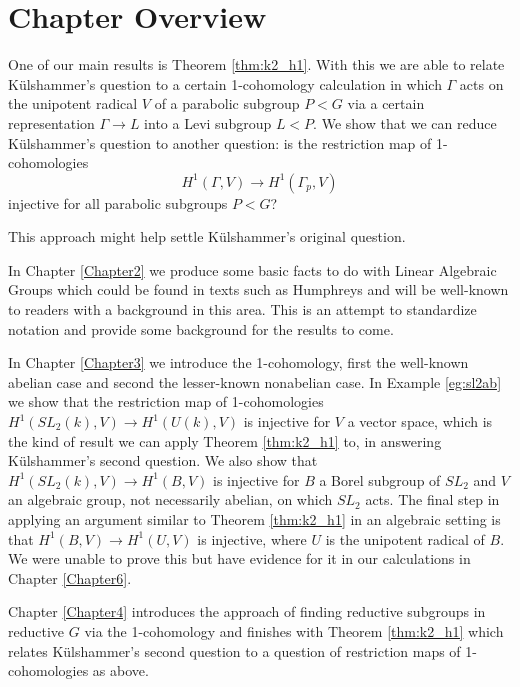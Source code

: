 \section{Chapter Overview}

One of our main results is Theorem \ref{thm:k2_h1}. With this we are able to relate K\"ulshammer's question to a certain 1-cohomology calculation in which $\Gamma$ acts on the unipotent radical $V$ of a parabolic subgroup $P < G$ via a certain representation $\Gamma \rightarrow L$ into a Levi subgroup $L < P$. We show that we can reduce K\"ulshammer's question to another question: is the restriction map of 1-cohomologies
\begin{displaymath}
  H^1(\Gamma, V) \rightarrow H^1(\Gamma_p, V)
\end{displaymath}
injective for all parabolic subgroups $P<G$?

This approach might help settle K\"ulshammer's original question.

In Chapter \ref{Chapter2} we produce some basic facts to do with Linear Algebraic Groups which could be found in texts such as Humphreys \cite{humphryes1975linear} and will be well-known to readers with a background in this area. This is an attempt to standardize notation and provide some background for the results to come.

In Chapter \ref{Chapter3} we introduce the 1-cohomology, first the well-known abelian case and second the lesser-known nonabelian case. In Example \ref{eg:sl2ab} we show that the restriction map of 1-cohomologies $H^1(SL_2(k), V) \rightarrow H^1(U(k), V)$ is injective for $V$ a vector space, which is the kind of result we can apply Theorem \ref{thm:k2_h1} to, in answering K\"ulshammer's second question. We also show that $H^1(SL_2(k), V) \rightarrow H^1(B, V)$ is injective for $B$ a Borel subgroup of $SL_2$ and $V$ an algebraic group, not necessarily abelian, on which $SL_2$ acts. The final step in applying an argument similar to Theorem \ref{thm:k2_h1} in an algebraic setting is that $H^1(B, V) \rightarrow H^1(U, V)$ is injective, where $U$ is the unipotent radical of $B$. We were unable to prove this but have evidence for it in our calculations in Chapter \ref{Chapter6}.

Chapter \ref{Chapter4} introduces the approach of finding reductive subgroups in reductive $G$ via the 1-cohomology and finishes with Theorem \ref{thm:k2_h1} which relates K\"ulshammer's second question to a question of restriction maps of 1-cohomologies as above.

